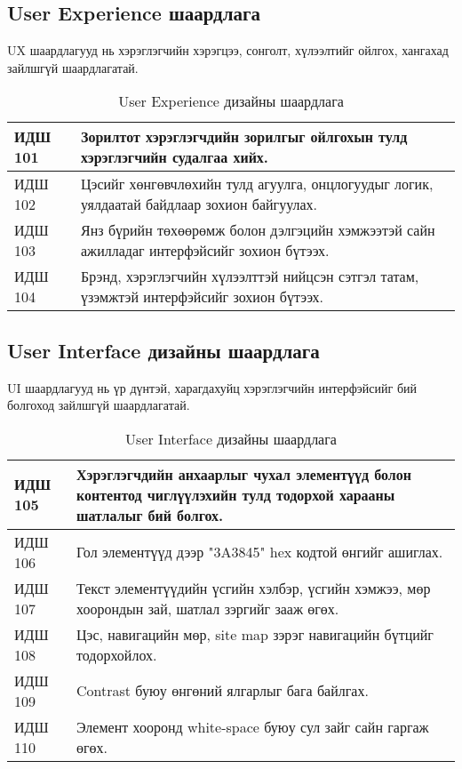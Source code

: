 \subsection{User Experience шаардлага}

UX шаардлагууд нь хэрэглэгчийн хэрэгцээ, сонголт, хүлээлтийг ойлгох, хангахад зайлшгүй шаардлагатай.

\begin{table}[h]
	\centering
	\caption{User Experience дизайны шаардлага}
	\begin{tabular}{ |p{2cm}|p{13cm}| }
		\hline
		ИДШ 101 & Зорилтот хэрэглэгчдийн зорилгыг ойлгохын тулд хэрэглэгчийн судалгаа хийх.                                                 \\ \hline
		ИДШ 102 & Цэсийг хөнгөвчлөхийн тулд агуулга, онцлогуудыг логик, уялдаатай байдлаар зохион байгуулах.                 \\ \hline
		ИДШ 103 & Янз бүрийн төхөөрөмж болон дэлгэцийн хэмжээтэй сайн ажилладаг интерфэйсийг зохион бүтээх.                       \\ \hline
		ИДШ 104 & Брэнд, хэрэглэгчийн хүлээлттэй нийцсэн сэтгэл татам, үзэмжтэй интерфэйсийг зохион бүтээх.                         \\ \hline
	\end{tabular}
\end{table}

\subsection{User Interface дизайны шаардлага}

UI шаардлагууд нь үр дүнтэй, харагдахуйц хэрэглэгчийн интерфэйсийг бий болгоход зайлшгүй шаардлагатай.

\begin{table}[h]
	\centering
	\caption{User Interface дизайны шаардлага}
	\begin{tabular}{ |p{2cm}|p{13cm}| }
		\hline
		ИДШ 105 & Хэрэглэгчдийн анхаарлыг чухал элементүүд болон контентод чиглүүлэхийн тулд тодорхой харааны шатлалыг бий болгох.                                                 \\ \hline
		ИДШ 106 & Гол элементүүд дээр "3A3845" hex кодтой өнгийг ашиглах.                 \\ \hline
		ИДШ 107 & Текст элементүүдийн үсгийн хэлбэр, үсгийн хэмжээ, мөр хоорондын зай, шатлал зэргийг зааж өгөх.                       \\ \hline
		ИДШ 108 & Цэс, навигацийн мөр, site map зэрэг навигацийн бүтцийг тодорхойлох.                         \\ \hline
		ИДШ 109 & Contrast буюу өнгөний ялгарлыг бага байлгах.                            \\ \hline
		ИДШ 110 & Элемент хооронд white-space буюу сул зайг сайн гаргаж өгөх.             \\  \hline
	\end{tabular}
\end{table}